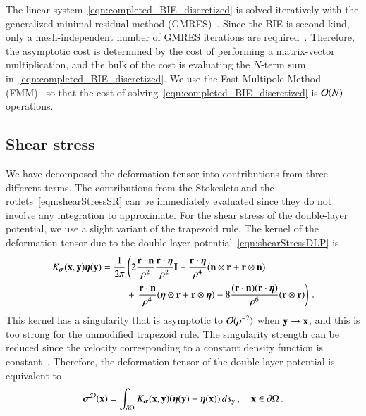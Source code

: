 \documentclass[preprint, 10pt]{elsarticle}
\begin{document}
The linear system~\eqref{eqn:completed_BIE_discretized} is solved iteratively with the generalized minimal residual method (GMRES)~\cite{saa-sch1986}.  Since the BIE is second-kind, only a mesh-independent number of GMRES iterations are required~\cite{cam-ips-kel-mey-xue1996}.  Therefore, the asymptotic cost is determined by the cost of performing a matrix-vector multiplication, and the bulk of the cost is evaluating the $N$-term sum in~\eqref{eqn:completed_BIE_discretized}. We use the Fast Multipole Method (FMM)~\cite{gre-rok1987, gre-gre-may1992} so that the cost of solving~\eqref{eqn:completed_BIE_discretized} is ${\mathcal{O}}(N)$ operations.

\subsection{Shear stress}
\label{sec:shearStress}
We have decomposed the deformation tensor into contributions from three different terms.  The contributions from the Stokeslets and the rotlets~\eqref{eqn:shearStressSR} can be immediately evaluated since they do not involve any integration to approximate.  For the shear stress of the double-layer potential, we use a slight variant of the trapezoid rule. The kernel of the deformation tensor due to the double-layer potential~\eqref{eqn:shearStressDLP} is 
\begin{equation}
\begin{aligned}
  K_{\boldsymbol\sigma}({\mathbf{x}},{\mathbf{y}}){\boldsymbol\eta}({\mathbf{y}}) &= \frac{1}{2\pi} \left(
    2\frac{{\mathbf{r}} \cdot {\mathbf{n}}}{\rho^2} \frac{{\mathbf{r}} \cdot {\boldsymbol\eta}}{\rho^2} {\mathbf{I}} + 
    \frac{{\mathbf{r}} \cdot {\boldsymbol\eta}}{\rho^4} ({\mathbf{n}} \otimes {\mathbf{r}} + {\mathbf{r}} \otimes {\mathbf{n}})
    \right. \\ & \hspace{25pt}+ \left.
    \frac{{\mathbf{r}} \cdot {\mathbf{n}}}{\rho^4} ({\boldsymbol\eta} \otimes {\mathbf{r}} + {\mathbf{r}} \otimes {\boldsymbol\eta}) - 
    8\frac{({\mathbf{r}} \cdot {\mathbf{n}})({\mathbf{r}} \cdot {\boldsymbol\eta})}{\rho^6}({\mathbf{r}} \otimes {\mathbf{r}})
  \right) \, .
\end{aligned}
\end{equation}
This kernel has a singularity that is asymptotic to ${\mathcal{O}}(\rho^{-2})$ when ${\mathbf{y}} \rightarrow {\mathbf{x}}$, and this is too strong for the unmodified trapezoid rule.  The singularity strength can be reduced since the velocity corresponding to a constant density function is constant~\cite{poz1992}.  Therefore, the deformation tensor of the double-layer potential is equivalent to
\begin{align}
  {\boldsymbol\sigma}^{{\mathcal{D}}}({\mathbf{x}}) = \int_{{\partial}\Omega}K_{\boldsymbol\sigma}({\mathbf{x}},{\mathbf{y}})
      ({\boldsymbol\eta}({\mathbf{y}}) - {\boldsymbol\eta}({\mathbf{x}})) \, ds_{{\mathbf{y}}}\, , \quad {\mathbf{x}} \in {\partial}\Omega \, .
\end{align}
\end{document}
